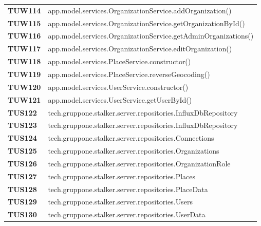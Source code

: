 \documentclass[../../piano-di-qualifica.tex]{subfiles}
\begin{document}
\begin{longtable}[H]{>{\centering\bfseries}m{3cm} >{}m{13cm}}
  TUW114             & app.model.services.OrganizationService.addOrganization\@()                                              \\


  TUW115             & app.model.services.OrganizationService.getOrganizationById\@()                                          \\

  TUW116             & app.model.services.OrganizationService.getAdminOrganizations\@()                                        \\

  TUW117             & app.model.services.OrganizationService.editOrganization\@()                                             \\



  TUW118             & app.model.services.PlaceService.constructor\@()                                                         \\

  TUW119             & app.model.services.PlaceService.reverseGeocoding\@()                                                    \\


  TUW120             & app.model.services.UserService.constructor\@()                                                          \\

  TUW121             & app.model.services.UserService.getUserById\@()                                                          \\


  TUS122 & tech.gruppone.stalker.server.repositories.InfluxDbRepository \\
  TUS123 & tech.gruppone.stalker.server.repositories.InfluxDbRepository \\


  TUS124 & tech.gruppone.stalker.server.repositories.Connections \\
  TUS125 & tech.gruppone.stalker.server.repositories.Organizations \\
  TUS126 & tech.gruppone.stalker.server.repositories.OrganizationRole \\
  TUS127 & tech.gruppone.stalker.server.repositories.Places \\
  TUS128 & tech.gruppone.stalker.server.repositories.PlaceData \\
  TUS129 & tech.gruppone.stalker.server.repositories.Users \\
  TUS130 & tech.gruppone.stalker.server.repositories.UserData \\


\end{longtable}
\end{document}
